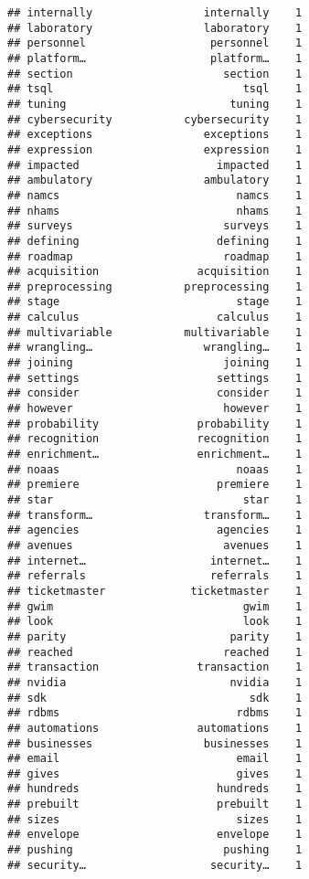 \documentclass[]{article}
\begin{document}
\begin{verbatim}
## internally                 internally    1
## laboratory                 laboratory    1
## personnel                   personnel    1
## platform…                   platform…    1
## section                       section    1
## tsql                             tsql    1
## tuning                         tuning    1
## cybersecurity           cybersecurity    1
## exceptions                 exceptions    1
## expression                 expression    1
## impacted                     impacted    1
## ambulatory                 ambulatory    1
## namcs                           namcs    1
## nhams                           nhams    1
## surveys                       surveys    1
## defining                     defining    1
## roadmap                       roadmap    1
## acquisition               acquisition    1
## preprocessing           preprocessing    1
## stage                           stage    1
## calculus                     calculus    1
## multivariable           multivariable    1
## wrangling…                 wrangling…    1
## joining                       joining    1
## settings                     settings    1
## consider                     consider    1
## however                       however    1
## probability               probability    1
## recognition               recognition    1
## enrichment…               enrichment…    1
## noaas                           noaas    1
## premiere                     premiere    1
## star                             star    1
## transform…                 transform…    1
## agencies                     agencies    1
## avenues                       avenues    1
## internet…                   internet…    1
## referrals                   referrals    1
## ticketmaster             ticketmaster    1
## gwim                             gwim    1
## look                             look    1
## parity                         parity    1
## reached                       reached    1
## transaction               transaction    1
## nvidia                         nvidia    1
## sdk                               sdk    1
## rdbms                           rdbms    1
## automations               automations    1
## businesses                 businesses    1
## email                           email    1
## gives                           gives    1
## hundreds                     hundreds    1
## prebuilt                     prebuilt    1
## sizes                           sizes    1
## envelope                     envelope    1
## pushing                       pushing    1
## security…                   security…    1

\end{verbatim}
\end{document}
